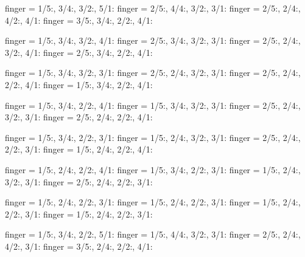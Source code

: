\documentclass[../main.tex]{subfiles}
\begin{document}

{finger = {1/5:\R, 3/4:, 3/2:, 5/1:}}
{finger = {2/5:, 4/4:, 3/2:, 3/1:\R}}
{finger = {2/5:, 2/4:\R, 4/2:, 4/1:}}
{finger = {3/5:, 3/4:, 2/2:\R, 4/1:}}

{finger = {1/5:\R, 3/4:, 3/2:, 4/1:}}
{finger = {2/5:, 3/4:, 3/2:, 3/1:\R}}
{finger = {2/5:, 2/4:\R, 3/2:, 4/1:}}
{finger = {2/5:, 3/4:, 2/2:\R, 4/1:}}

{finger = {1/5:\R, 3/4:, 3/2:, 3/1:}}
{finger = {2/5:, 2/4:, 3/2:, 3/1:\R}}
{finger = {2/5:, 2/4:\R, 2/2:, 4/1:}}
{finger = {1/5:, 3/4:, 2/2:\R, 4/1:}}

{finger = {1/5:\R, 3/4:, 2/2:, 4/1:}}
{finger = {1/5:, 3/4:, 3/2:, 3/1:\R}}
{finger = {2/5:, 2/4:\R, 3/2:, 3/1:}}
{finger = {2/5:, 2/4:, 2/2:\R, 4/1:}}


{finger = {1/5:\R, 3/4:, 2/2:, 3/1:}}
{finger = {1/5:, 2/4:, 3/2:, 3/1:\R}}
{finger = {2/5:, 2/4:\R, 2/2:, 3/1:}}
{finger = {1/5:, 2/4:, 2/2:\R, 4/1:}}

{finger = {1/5:\R, 2/4:, 2/2:, 4/1:}}
{finger = {1/5:, 3/4:, 2/2:, 3/1:\R}}
{finger = {1/5:, 2/4:\R, 3/2:, 3/1:}}
{finger = {2/5:, 2/4:, 2/2:\R, 3/1:}}


{finger = {1/5:\R, 2/4:, 2/2:, 3/1:}}
{finger = {1/5:, 2/4:, 2/2:, 3/1:\R}}
{finger = {1/5:, 2/4:\R, 2/2:, 3/1:}}
{finger = {1/5:, 2/4:, 2/2:\R, 3/1:}}

{finger = {1/5:\R, 3/4:, 2/2:, 5/1:}}
{finger = {1/5:, 4/4:, 3/2:, 3/1:\R}}
{finger = {2/5:, 2/4:\R, 4/2:, 3/1:}}
{finger = {3/5:, 2/4:, 2/2:\R, 4/1:}}
\end{document}
